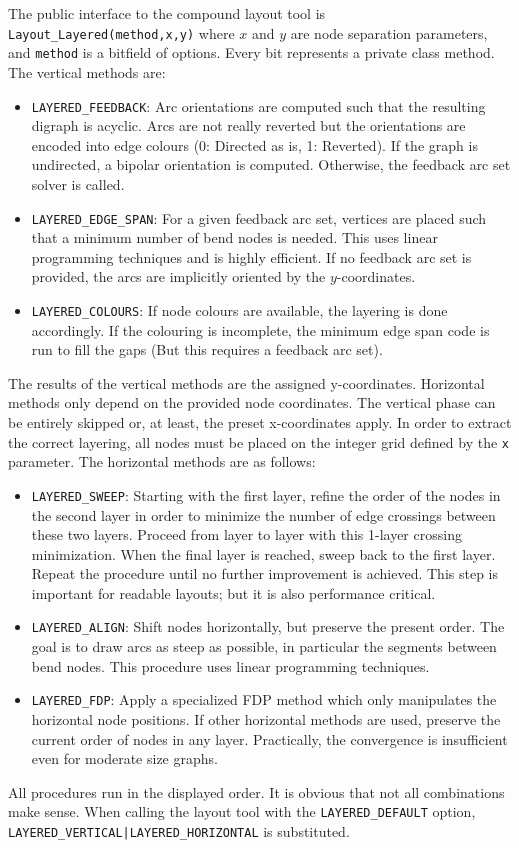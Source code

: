 \documentclass[a4paper,11pt,twoside]{book}
\begin{document}
\begin{multicols}{2}
The public interface to the compound layout tool is \verb/Layout_Layered(method,x,y)/
where $x$ and $y$ are node separation parameters, and \verb/method/ is a
bitfield of options. Every bit represents a private class method. The vertical
methods are:
\begin{itemize}
\item \verb/LAYERED_FEEDBACK/: Arc orientations are computed such that the
    resulting digraph is acyclic. Arcs are not really reverted but the
    orientations are encoded into edge colours (0: Directed as is, 1: Reverted).
    If the graph is undirected, a bipolar orientation is computed. Otherwise,
    the feedback arc set solver is called.
\item \verb/LAYERED_EDGE_SPAN/: For a given feedback arc set, vertices are
    placed such that a minimum number of bend nodes is needed. This uses linear
    programming techniques and is highly efficient. If no feedback arc set is
    provided, the arcs are implicitly oriented by the $y$-coordinates.
\item \verb/LAYERED_COLOURS/: If node colours are available, the layering is
    done accordingly. If the colouring is incomplete, the minimum edge span
    code is run to fill the gaps (But this requires a feedback arc set).
\end{itemize}
The results of the vertical methods are the assigned y-coordinates. Horizontal
methods only depend on the provided node coordinates. The vertical phase can be
entirely skipped or, at least, the preset x-coordinates apply. In order to extract
the correct layering, all nodes must be placed on the integer grid defined by
the \verb/x/ parameter. The horizontal methods are as follows:
\begin{itemize}
\item \verb/LAYERED_SWEEP/: Starting with the first layer, refine the
    order of the nodes in the second layer in order to minimize the number of
    edge crossings between these two layers. Proceed from layer to layer with this
    1-layer crossing minimization. When the final layer is reached, sweep back
    to the first layer. Repeat the procedure until no further improvement is
    achieved. This step is important for readable layouts; but it is also performance
    critical.
\item \verb/LAYERED_ALIGN/: Shift nodes horizontally, but preserve the present
    order. The goal is to draw arcs as steep as possible, in particular the
    segments between bend nodes. This procedure uses linear programming techniques.
\item \verb/LAYERED_FDP/: Apply a specialized FDP method which only manipulates
    the horizontal node positions. If other horizontal methods are used,
    preserve the current order of nodes in any layer. Practically, the convergence
    is insufficient even for moderate size graphs.
\end{itemize}
All procedures run in the displayed order. It is obvious that not all
combinations make sense. When calling the layout tool with the
\verb/LAYERED_DEFAULT/ option, \verb/LAYERED_VERTICAL|LAYERED_HORIZONTAL/
is substituted.


\end{multicols}
\end{document}
